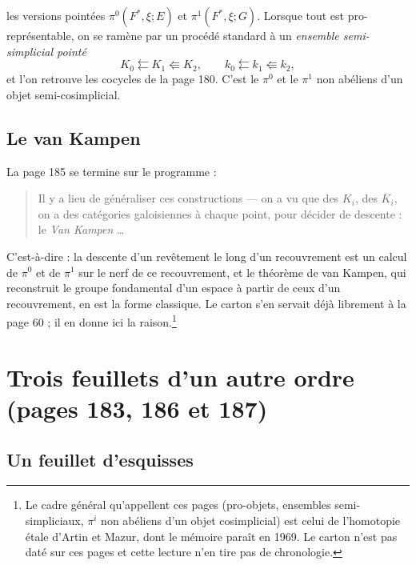 \documentclass[11pt,a4paper]{article}
\begin{document}
les versions pointées $\pi^{0}(F^{*}, \xi; E)$ et $\pi^{1}(F^{*}, \xi; G)$.
Lorsque tout est pro-représentable, on se ramène par un procédé standard à un
\emph{ensemble semi-simplicial pointé}
\[
  K_{0} \leftleftarrows K_{1} \Lleftarrow K_{2} ,
  \qquad
  k_{0} \leftleftarrows k_{1} \Lleftarrow k_{2} ,
\]
et l'on retrouve les cocycles de la page 180. C'est le $\pi^{0}$ et
le $\pi^{1}$ non abéliens d'un objet semi-cosimplicial.

\subsection*{Le van Kampen}

La page 185 se termine sur le programme :

\begin{quote}
Il y a lieu de généraliser ces constructions --- on a vu que des $K_{i}$, des
$\overline{K}_{i}$, on a des catégories galoisiennes à chaque point, pour
décider de descente : le \emph{Van Kampen} …
\end{quote}

C'est-à-dire : la descente d'un revêtement le long d'un recouvrement est un
calcul de $\pi^{0}$ et de $\pi^{1}$ sur le nerf de ce recouvrement, et le
théorème de van Kampen, qui reconstruit le groupe fondamental d'un espace à
partir de ceux d'un recouvrement, en est la forme classique. Le carton s'en
servait déjà librement à la page 60 ; il en donne ici la raison.\footnote{Le
cadre général qu'appellent ces pages (pro-objets, ensembles semi-simpliciaux,
$\pi^{i}$ non abéliens d'un objet cosimplicial) est celui de l'homotopie
étale d'Artin et Mazur, dont le mémoire paraît en 1969. Le carton n'est pas
daté sur ces pages et cette lecture n'en tire pas de chronologie.}

\section*{Trois feuillets d'un autre ordre (pages 183, 186 et 187)}

\subsection*{Un feuillet d'esquisses}
\end{document}
